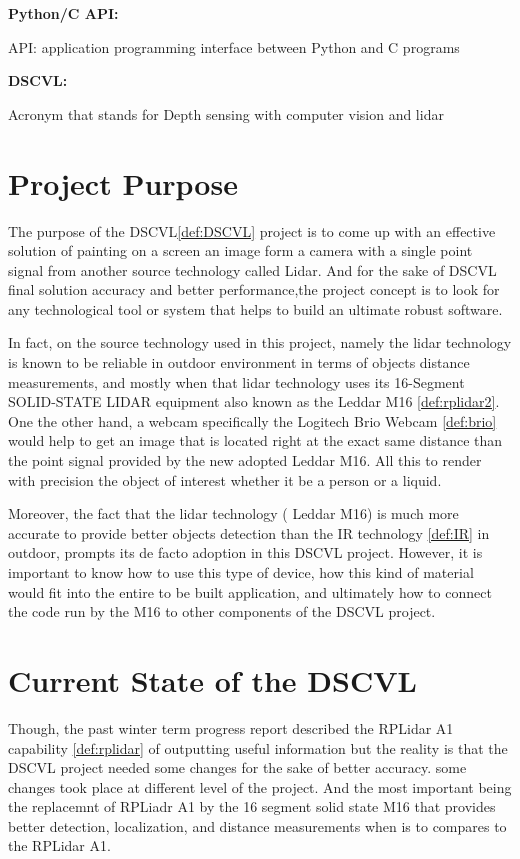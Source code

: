 \documentclass[onecolumn, draftclsnofoot,10pt, compsoc]{IEEEtran}
\begin{document}
\begin{singlespace}
		
		
		\textbf{Python/C API: }\label{def:API}\cite{Ctype}\par
		API: application programming interface between Python and C programs
		
		\textbf{DSCVL: }\label{def:DSCVL}\par
		Acronym that stands for Depth sensing with computer vision and lidar


		
		
	\section{Project Purpose}
The purpose of the DSCVL\ref{def:DSCVL} project is to come up with an effective solution of painting on a screen an image form a camera with a single point signal from another source technology called Lidar. And for the sake of DSCVL final solution accuracy and better performance,the project concept is to look for any technological tool or system that helps to build an ultimate robust software.

 In fact, on the source technology used in this project, namely the  lidar technology is known to be reliable in outdoor environment in terms of objects distance measurements, and mostly when that lidar technology uses its  16-Segment SOLID-STATE LIDAR equipment also known as the Leddar M16 \ref{def:rplidar2}. One the other hand, a webcam specifically the Logitech Brio Webcam \ref{def:brio} would help to get an image that is located right at the exact same distance than the point signal provided by the new adopted Leddar M16. All this to render with precision the object of interest whether it be a person or a liquid.
 
Moreover, the fact that the lidar technology ( Leddar M16) is much more accurate to provide better objects detection than the IR technology \ref{def:IR} in outdoor, prompts  its de facto adoption in this DSCVL project. However, it is important to know how to use this type of device, how this kind of material would fit into the entire to be built application, and ultimately how to connect the code run by the M16 to other components of the DSCVL project. \par

\section{Current State of the DSCVL}
Though, the past winter term progress report described the RPLidar A1 capability  \ref{def:rplidar} of outputting  useful information but the reality is that the DSCVL project  needed some changes for the sake of better accuracy. some changes took place at different level of the project. And the most important being the replacemnt of RPLiadr A1 by the 16 segment solid state M16 that provides better detection, localization, and distance measurements when is to compares to the RPLidar A1.\par


\end{singlespace}
\end{document}
